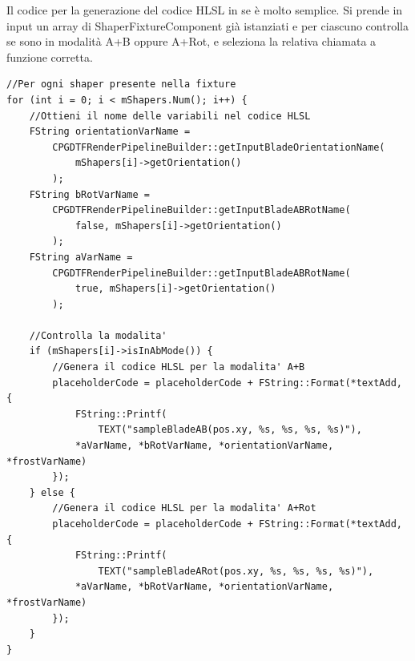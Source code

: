 \documentclass[main.tex]{subfiles}
\begin{document}
Il codice per la generazione del codice HLSL in se è molto semplice. Si prende in input un array di ShaperFixtureComponent già istanziati e per ciascuno controlla se sono in modalità A+B oppure A+Rot, e seleziona la relativa chiamata a funzione corretta.
\begin{lstlisting}
//Per ogni shaper presente nella fixture
for (int i = 0; i < mShapers.Num(); i++) {
    //Ottieni il nome delle variabili nel codice HLSL
    FString orientationVarName =
        CPGDTFRenderPipelineBuilder::getInputBladeOrientationName(
            mShapers[i]->getOrientation()
        );
    FString bRotVarName =
        CPGDTFRenderPipelineBuilder::getInputBladeABRotName(
            false, mShapers[i]->getOrientation()
        );
    FString aVarName =
        CPGDTFRenderPipelineBuilder::getInputBladeABRotName(
            true, mShapers[i]->getOrientation()
        );

    //Controlla la modalita'
    if (mShapers[i]->isInAbMode()) {
        //Genera il codice HLSL per la modalita' A+B
        placeholderCode = placeholderCode + FString::Format(*textAdd, {
            FString::Printf(
                TEXT("sampleBladeAB(pos.xy, %s, %s, %s, %s)"),
            *aVarName, *bRotVarName, *orientationVarName, *frostVarName)
        });
    } else {
        //Genera il codice HLSL per la modalita' A+Rot
        placeholderCode = placeholderCode + FString::Format(*textAdd, {
            FString::Printf(
                TEXT("sampleBladeARot(pos.xy, %s, %s, %s, %s)"),
            *aVarName, *bRotVarName, *orientationVarName, *frostVarName)
        });
    }
}
\end{lstlisting}
\end{document}
